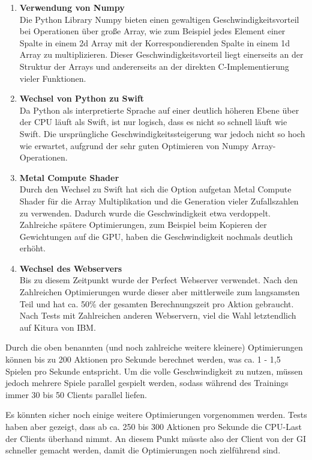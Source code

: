 \documentclass[11pt, twocolumn]{article}
\begin{document}
\begin{enumerate}
	\item \textbf{Verwendung von Numpy} \\
		Die Python Library Numpy bieten einen gewaltigen Geschwindigkeitsvorteil bei Operationen über große Array, wie zum Beispiel jedes Element einer Spalte in einem 2d Array mit der Korrespondierenden Spalte in einem 1d Array zu multiplizieren. Dieser Geschwindigkeitsvorteil liegt einerseits an der Struktur der Arrays und andererseits an der direkten C-Implementierung vieler Funktionen.
	\item \textbf{Wechsel von Python zu Swift} \\
		Da Python als interpretierte Sprache auf einer deutlich höheren Ebene über der CPU läuft als Swift, ist nur logisch, dass es nicht so schnell läuft wie Swift. Die ursprüngliche Geschwindigkeitssteigerung war jedoch nicht so hoch wie erwartet, aufgrund der sehr guten Optimieren von Numpy Array-Operationen.
	\item \textbf{Metal Compute Shader}\\
		Durch den Wechsel zu Swift hat sich die Option aufgetan Metal Compute Shader für die Array Multiplikation und die Generation vieler Zufallszahlen zu verwenden. Dadurch wurde die Geschwindigkeit etwa verdoppelt. Zahlreiche spätere Optimierungen, zum Beispiel beim Kopieren der Gewichtungen auf die GPU, haben die Geschwindigkeit nochmals deutlich erhöht.
	\item \textbf{Wechsel des Webservers}\\
		Bis zu diesem Zeitpunkt wurde der Perfect Webserver verwendet. Nach den Zahlreichen Optimierungen wurde dieser aber mittlerweile zum langsamsten Teil und hat ca. 50\% der gesamten Berechnungszeit pro Aktion gebraucht. Nach Tests mit Zahlreichen anderen Webservern, viel die Wahl letztendlich auf Kitura von IBM.
\end{enumerate}

Durch die oben benannten (und noch zahlreiche weitere kleinere) Optimierungen können bis zu 200 Aktionen pro Sekunde berechnet werden, was ca. 1 - 1,5 Spielen pro Sekunde entspricht. Um die volle Geschwindigkeit zu nutzen, müssen jedoch mehrere Spiele parallel gespielt werden, sodass während des Trainings immer 30 bis 50 Clients parallel liefen.

Es könnten sicher noch einige weitere Optimierungen vorgenommen werden. Tests haben aber gezeigt, dass ab ca. 250 bis 300 Aktionen pro Sekunde die CPU-Last der Clients überhand nimmt. An diesem Punkt müsste also der Client von der GI schneller gemacht werden, damit die Optimierungen noch zielführend sind.
\end{document}
